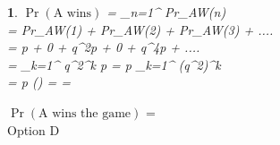 \documentclass[journal,12pt,twocolumn]{IEEEtran}
\newtheorem{definition}{}
\providecommand{\pr}[1]{\ensuremath{\Pr\left(#1\right)}}
\theoremstyle{remark}
\numberwithin{equation}{subsection}
\begin{document}
\begin{definition}
    \pr{\text{A wins}} = \sum_{n=1}^{\infty} Pr_{AW}(n)\\
    = Pr_{AW}(1) + Pr_{AW}(2) + Pr_{AW}(3) + ....\\
    = p + 0 + q^2p + 0 + q^4p + ....\\
    
    = \sum_{k=1}^{\infty} q^2^k p
    = p \sum_{k=1}^{\infty} (q^2)^k \hspace{0.5cm} \\
    
    = p \left(\right)
    = = 
\end{definition}

\centering
\Large \pr{\text{A wins the game}} = 
\\Option D
\end{document}
